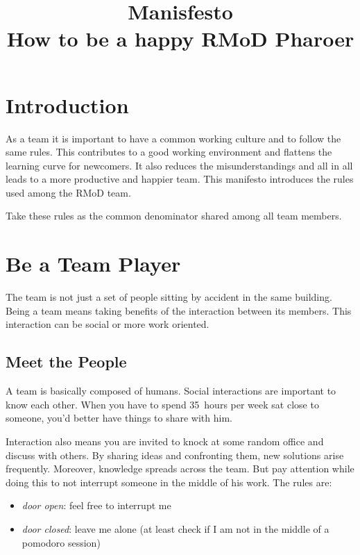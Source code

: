 \documentclass[10pt]{article}
\begin{document}
\title{Manisfesto\\How to be a happy RMoD Pharoer}
\author{}
\date{}
\maketitle


\section*{Introduction}

As a team it is important to have a common working culture and to follow the same rules. This contributes to a good working environment and flattens the learning curve for newcomers. It also reduces the misunderstandings and all in all leads to a more productive and happier team. This manifesto introduces the rules used among the RMoD team.

Take these rules as the common denominator shared among all team members.

\section{Be a Team Player}

The team is not just a set of people sitting by accident in the same building. Being a team means taking benefits of the interaction between its members.
This interaction can be social or more work oriented.

\subsection{Meet the People}

A team is basically composed of humans. Social interactions are important to know each other. When you have to spend 35~hours per week sat close to someone, you'd better have things to share with him.

Interaction also means you are invited to knock at some random office and discuss with others. By sharing  ideas and confronting them, new solutions arise frequently. Moreover, knowledge spreads across the team. But pay attention while doing this to not interrupt someone in the middle of his work.
The rules are:
\begin{itemize}
\item \emph{door open}: feel free to interrupt me
\item \emph{door closed}: leave me alone (at least check if I am not in the middle of a pomodoro session)
\end{itemize}
\end{document}
